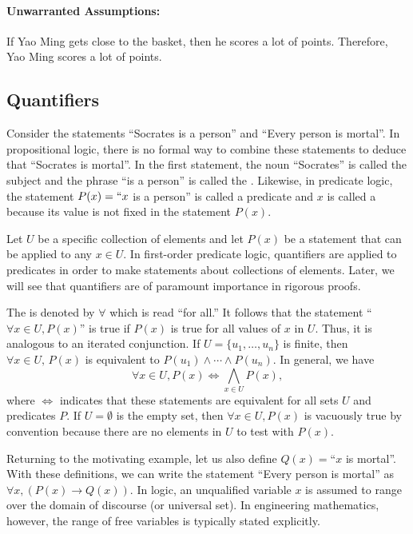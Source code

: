 \paragraph{Unwarranted Assumptions:}
If Yao Ming gets close to the basket, then he scores a lot of points.
Therefore, Yao Ming scores a lot of points.


\subsection{Quantifiers}

Consider the statements ``Socrates is a person'' and ``Every person is mortal''.
In propositional logic, there is no formal way to combine these statements to deduce that ``Socrates is mortal''.
In the first statement, the noun ``Socrates'' is called the subject and the phrase ``is a person'' is called the .
Likewise, in predicate logic, the statement $P(x)=``x$ is a person'' is called a predicate and $x$ is called a  because its value is not fixed in the statement $P(x)$.

Let $U$ be a specific collection of elements and let $P(x)$ be a statement that can be applied to any $x\in U$.
In first-order predicate logic, quantifiers are applied to predicates in order to make statements about collections of elements.
Later, we will see that quantifiers are of paramount importance in rigorous proofs.

The  is denoted by $\forall$ which is read ``for all.''
It follows that the statement ``$\forall x \in U, P(x)$'' is true if $P(x)$ is true for all values of $x$ in $U$.
Thus, it is analogous to an iterated conjunction.
If $U=\{u_1,\ldots,u_n\}$ is finite, then $\forall x\in U,\,P(x)$ is equivalent to $P(u_1)\wedge\cdots\wedge P(u_n)$.
In general, we have
\[ \forall x \in U, P(x) \Leftrightarrow \bigwedge_{x\in U} P(x), \]
where $\Leftrightarrow$ indicates that these statements are equivalent for all sets $U$ and predicates $P$.
If $U=\emptyset$ is the empty set, then $\forall x \in U, P(x)$ is vacuously true by convention because there are no elements in $U$ to test with $P(x)$.

Returning to the motivating example, let us also define $Q(x)=$``$x$ is mortal''.
With these definitions, we can write the statement ``Every person is mortal'' as $\forall x, ( P(x) \to Q(x) )$.
In logic, an unqualified variable $x$ is assumed to range over the domain of discourse (or universal set).
In engineering mathematics, however, the range of free variables is typically stated explicitly.
 

